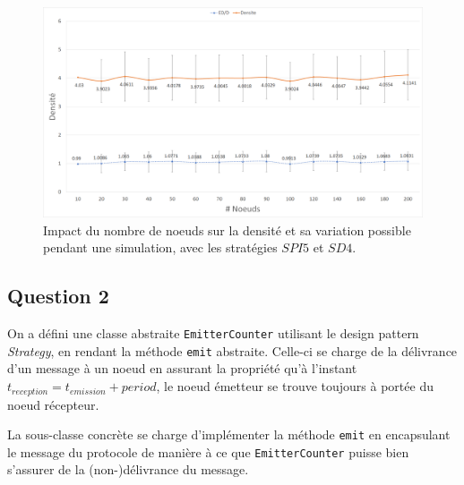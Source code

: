 \documentclass[a4paper]{article}
\begin{document}
\begin{figure}[H]
\begin{minipage}{\textwidth}
  \centering
    \includegraphics[width=\textwidth]{images/ex2.png}
    \caption{Impact du nombre de noeuds sur la densité et sa variation possible
      pendant une simulation, avec les stratégies $SPI5$ et $SD4$.}
\end{minipage}
\end{figure}

\subsection{Question 2}
On a défini une classe abstraite \texttt{EmitterCounter} utilisant le
design pattern \textsl{Strategy}, en rendant la méthode \texttt{emit}
abstraite. Celle-ci se charge de la délivrance d'un message à un noeud
en assurant la propriété qu'à l'instant  $t_{reception}=t_{emission}+period$, le noeud émetteur se trouve toujours à portée du noeud
récepteur.

La sous-classe concrète se charge d'implémenter la méthode
\texttt{emit} en encapsulant le message du protocole de manière à ce
que \texttt{EmitterCounter} puisse bien s'assurer de la
(non-)délivrance du message.
\end{document}
